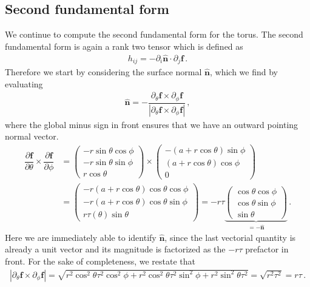 \documentclass[11pt, DINA4, fleqn]{amsart}
\def\vn{\boldsymbol{n}\xspace}
\def\vf{\boldsymbol{f}\xspace}
\begin{document}
\subsection{Second fundamental form}
We continue to compute the second fundamental form for the torus.
The second fundamental form is again a rank two tensor which is defined as
\begin{align}
h_{ij} = -\partial_i \hat{\vn} \cdot \partial_j \vf \, .
\end{align}
Therefore we start by considering the surface normal $\hat{\vn}$, which we find by evaluating
\begin{align}
\hat{\vn} = -\dfrac{\partial_{\theta} \vf \times \partial_{\phi}\vf}{|\partial_{\theta} \vf \times \partial_{\phi}\vf|} \, ,
\end{align}
where the global minus sign in front ensures that we have an outward pointing normal vector.
\begin{align}
\dfrac{\partial \vf}{\partial \theta} \times \dfrac{\partial \vf}{\partial \phi} 
&=
\begin{pmatrix}
-r\sin\theta\cos\phi \\
-r\sin\theta\sin\phi \\
r\cos\theta
\end{pmatrix}
\times
\begin{pmatrix}
-(a+r\cos\theta)\sin\phi \\
(a+r\cos\theta)\cos\phi \\
0
\end{pmatrix} \\
&= \begin{pmatrix}
-r(a+r\cos\theta)\cos\theta\cos\phi \\
-r(a+r\cos\theta)\cos\theta\sin\phi \\
r\tau(\theta)\sin\theta 
\end{pmatrix}
=- r\tau
\underbrace{\begin{pmatrix}
\cos\theta\cos\phi \\
\cos\theta\sin\phi \\
\sin\theta
\end{pmatrix}}_{=-\hat{\vn}} \, .
\end{align}
Here we are immediately able to identify $\hat{\vn}$, since the last vectorial quantity is already a unit vector and its magnitude is factorized as the $-r\tau$ prefactor in front.
For the sake of completeness, we restate that
\begin{align}
|\partial_{\theta}\vf \times \partial_{\phi}\vf | = \sqrt{
r^2\cos^2\theta \tau^2 \cos^2\phi +
r^2\cos^2\theta \tau^2 \sin^2\phi +
r^2\sin^2\theta \tau^2
}=
\sqrt{r^2\tau^2} = r\tau \, .
\end{align}
\end{document}
